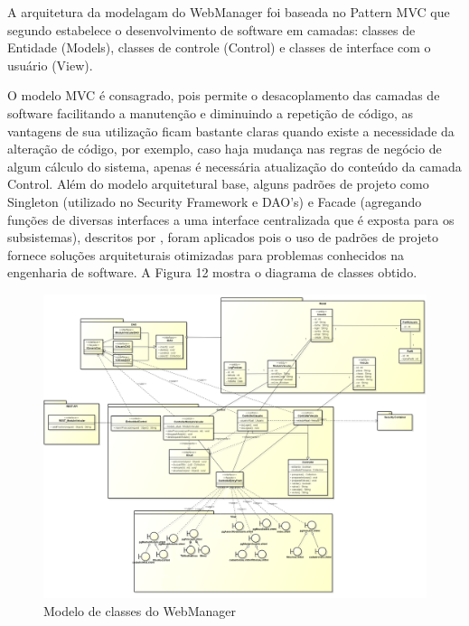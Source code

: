 A arquitetura da modelagam do WebManager foi baseada no Pattern MVC que segundo \textcite{Mendes:2002} estabelece o desenvolvimento de software em camadas: classes de Entidade (Models), classes de controle (Control) e classes de interface com o usuário (View). 

O modelo MVC é consagrado, pois permite o desacoplamento das camadas de software facilitando a manutenção e diminuindo a repetição de código, as vantagens de sua utilização ficam bastante claras quando existe a necessidade da alteração de código, por exemplo, caso haja mudança nas regras de negócio de algum cálculo do sistema, apenas é necessária atualização do conteúdo da camada Control. Além do modelo arquitetural base, alguns padrões de projeto como Singleton (utilizado no Security Framework e DAO's) e Facade (agregando funções de diversas interfaces a uma interface centralizada que é exposta para os subsistemas), descritos por \textcite{Gamma:2000}, foram aplicados pois o uso de padrões de projeto fornece soluções arquiteturais otimizadas para problemas conhecidos na engenharia de software. A Figura 12 mostra o diagrama de classes obtido.

\begin{landscape}

\begin{figure}[!htb]
	\centering
	\includegraphics[width=20.00cm\textwidth]{figures/6_web_manager.png}
	\caption{Modelo de classes do WebManager}
	\label{Figura 12}
\end{figure}
\end{landscape}

